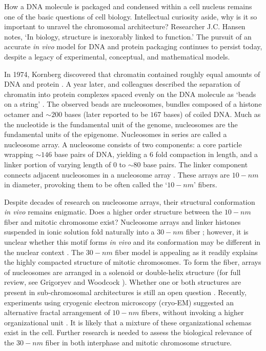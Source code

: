 How a \gls{DNA} molecule is packaged and condensed within a cell nucleus remains one of the basic questions of cell biology.  Intellectual curiosity aside,
why is it so important to unravel the chromosomal architecture?  Researcher J.C. Hansen notes, `In biology, structure is inexorably linked to function.' \citep{hansen2012}
The pursuit of an accurate \textit{\gls{in vivo}} model for \gls{DNA} and protein packaging continues to persist today, despite a legacy of experimental,
conceptual, and mathematical models.

In 1974, Kornberg discovered that chromatin contained roughly equal amounts of \gls{DNA} and protein \citep{kornberg1974}.  A year later, \citet{oudet1975}
and colleagues described the separation of chromatin into protein complexes spaced evenly on the \gls{DNA} molecule as `beads on a string' \citep{oudet1975}.
The observed beads are nucleosomes, bundles composed of a histone octamer and $\sim200$ bases (later reported to be $167$ bases) \citep{robinson2006} of
coiled \gls{DNA}. Much as the nucleotide is the fundamental unit of the genome, nucleosomes are the fundamental units of the epigenome.  Nucleosomes in
series are called a \gls{nucleosome array}.  A nucleosome consists of two components: a core particle wrapping $\sim146$ base pairs of DNA, yielding a
6 fold compaction in length, and a linker portion of varying length of $0$ to $\sim80$ base pairs.  The linker component connects adjacent nucleosomes
in a nucleosome array \citep{wu2007, hansen2012}.  These arrays are $10-nm$ in diameter, provoking them to be often called the `$10-nm$' fibers.

Despite decades of research on nucleosome arrays, their structural conformation \textit{\gls{in vivo}} remains enigmatic.  Does a higher order structure
between the $10-nm$ fiber and mitotic chromosome exist?  Nucleosome arrays and linker histones suspended in ionic solution fold naturally into a $30-nm$ fiber
\citep{tremethick2007}; however, it is unclear whether this motif forms \textit{\gls{in vivo}} and its conformation may be different in the nuclear context \citep{bian2012}.
The $30-nm$ fiber model is appealing as it readily explains the highly compacted structure of mitotic chromosomes.  To form the fiber, arrays of nucleosomes
are arranged in a solenoid or double-helix structure (for full review, see Grigoryev and Woodcock \citep{grigoryev2012}).  Whether one or both structures
are present in sub-chromosomal architectures is still an open question \citep{song2014}.  Recently, experiments using cryogenic electron microscopy
(cryo-EM) suggested an alternative fractal arrangement of $10-nm$ fibers, without invoking a higher organizational unit \citep{nishino2012,hansen2012}.
It is likely that a mixture of these organizational schemas exist in the cell.  Further research is needed to assess the biological relevance of the $30-nm$ fiber in
both interphase and mitotic chromosome structure.

